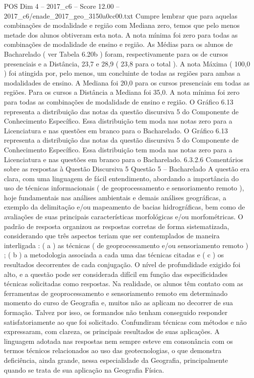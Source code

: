 \begin{textsample}{POS Dim 4 – 2017\_c6 – Score 12.00 – 2017\_c6/enade\_2017\_geo\_3150a0cc00.txt}
Cumpre lembrar que para aquelas combinações de modalidade e região com Mediana zero, temos que pelo menos metade dos alunos obtiveram esta nota.
A nota mínima foi zero para todas as combinações de modalidade de ensino e região.
As Médias para os alunos de Bacharelado ( ver Tabela 6.20b ) foram, respectivamente para os de cursos presenciais e a Distância, 23,7 e 28,9 ( 23,8 para o total ).
A nota Máxima ( 100,0 ) foi atingida por, pelo menos, um concluinte de todas as regiões para ambas a modalidades de ensino.
A Mediana foi 20,0 para os cursos presenciais em todas as regiões.
Para os cursos a Distância a Mediana foi 35,0.
A nota mínima foi zero para todas as combinações de modalidade de ensino e região.
O Gráfico 6.13 representa a distribuição das notas da questão discursiva 5 do Componente de Conhecimento Específico.
Essa distribuição tem moda nas notas zero para a Licenciatura e nas questões em branco para o Bacharelado.
O Gráfico 6.13 representa a distribuição das notas da questão discursiva 5 do Componente de Conhecimento Específico.
Essa distribuição tem moda nas notas zero para a Licenciatura e nas questões em branco para o Bacharelado. 6.3.2.6 Comentários sobre as respostas à Questão Discursiva 5 Questão 5 – Bacharelado A questão era clara, com uma linguagem de fácil entendimento, abordando a importância do uso de técnicas informacionais ( de geoprocessamento e sensoriamento remoto ), hoje fundamentais nas análises ambientais e demais análises geográficas, a exemplo da delimitação e/ou mapeamento de bacias hidrográficas, bem como de avaliações de suas principais características morfológicas e/ou morfométricas.
O padrão de resposta organizou as respostas corretas de forma sistematizada, considerando que três aspectos teriam que ser contemplados de maneira interligada : ( a ) as técnicas ( de geoprocessamento e/ou sensoriamento remoto ) ; ( b ) a metodologia associada a cada uma das técnicas citadas e ( c ) os resultados decorrentes de cada conjugação.
O nível de profundidade exigido foi alto, e a questão pode ser considerada difícil em função das especificidades técnicas solicitadas como respostas.
Na realidade, os alunos têm contato com as ferramentas de geoprocessamento e sensoriamento remoto em determinado momento do curso de Geografia e, muitos não as aplicam no decorrer de sua formação.
Talvez por isso, os formandos não tenham conseguido responder satisfatoriamente ao que foi solicitado.
Confundiram técnicas com métodos e não expressaram, com clareza, os principais resultados de suas aplicações.
A linguagem adotada nas respostas nem sempre esteve em consonância com os termos técnicos relacionados ao uso das geotecnologias, o que demonstra deficiência, ainda grande, nessa especialidade da Geografia, principalmente quando se trata de sua aplicação na Geografia Física.

\end{textsample}
